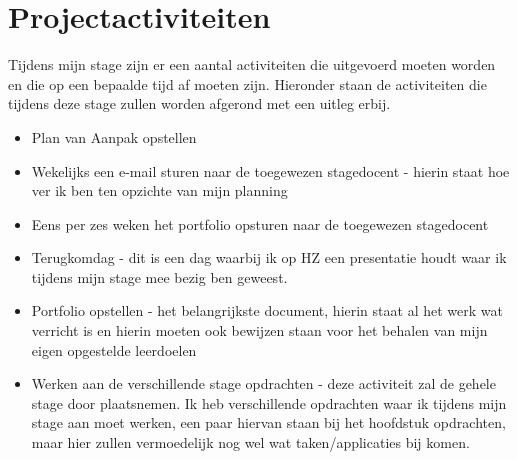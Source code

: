 
\section{Projectactiviteiten}
Tijdens mijn stage zijn er een aantal activiteiten die uitgevoerd moeten worden en die op een bepaalde tijd af moeten zijn.
Hieronder staan de activiteiten die tijdens deze stage zullen worden afgerond met een uitleg erbij.
\begin{itemize}
\item Plan van Aanpak opstellen
\item Wekelijks een e-mail sturen naar de toegewezen stagedocent - hierin staat hoe ver ik ben ten opzichte van mijn planning
\item Eens per zes weken het portfolio opsturen naar de toegewezen stagedocent
\item Terugkomdag - dit is een dag waarbij ik op HZ een presentatie houdt waar ik tijdens mijn stage mee bezig ben geweest.
\item Portfolio opstellen - het belangrijkste document, hierin staat al het werk wat verricht is en hierin moeten ook bewijzen staan voor het behalen van mijn eigen opgestelde leerdoelen
\item Werken aan de verschillende stage opdrachten - deze activiteit zal de gehele stage door plaatsnemen. Ik heb verschillende opdrachten waar ik tijdens mijn stage aan moet werken, een paar hiervan staan bij het hoofdstuk opdrachten, maar hier zullen vermoedelijk nog wel wat taken/applicaties bij komen.
\end{itemize}

\clearpage

